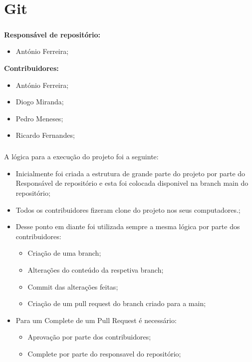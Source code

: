 \chapter*{\thechapter \quad Git}
\paragraph{}

\textbf{Responsável de repositório:}
\begin{itemize}
   \item António Ferreira;
\end{itemize}

\textbf{Contribuidores:}
\begin{itemize}
   \item António Ferreira; 
   \item Diogo Miranda; 
   \item Pedro Meneses; 
   \item Ricardo Fernandes; 
\end{itemize}

\paragraph{}
A lógica para a execução do projeto foi a seguinte:
\begin{itemize}
    \item Inicialmente foi criada a estrutura de grande parte do projeto por parte do Responsável de repositório e esta foi colocada disponivel na branch main do repositório;
    \item Todos os contribuidores fizeram clone do projeto nos seus computadores.;
    \item Desse ponto em diante foi utilizada sempre a mesma lógica por parte dos contribuidores:
    \begin{itemize}
    \item Criação de uma branch;
    \item Alterações do conteúdo da respetiva branch;
    \item Commit das alterações feitas;
    \item Criação de um pull request do branch criado para a main;
    \end{itemize}
    
    \item Para um Complete de um Pull Request é necessário:
    \begin{itemize}
    \item Aprovação por parte dos contribuidores;
    \item Complete por parte do responsavel do repositório;
    \end{itemize}
\end{itemize}




